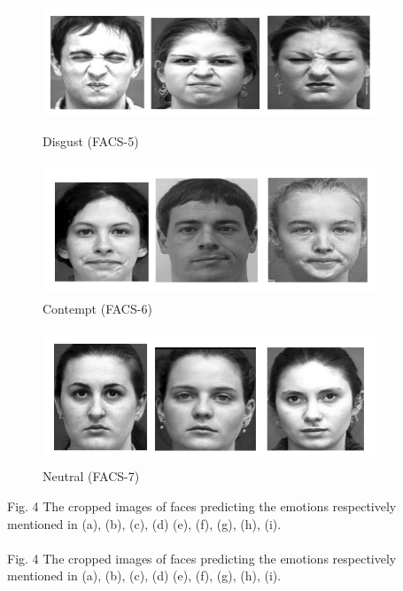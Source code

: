 \documentclass[a4paper,12pt,oneside]{article}
\begin{document}
\begin{figure}[H]
\centering
\includegraphics[height=4cm,width=10cm]{disgust.jpg}
\caption{Disgust (FACS-5)}
\end{figure}

\begin{figure}[H]
\centering
\includegraphics[height=4cm,width=10cm]{contempt.jpg}
\caption{Contempt (FACS-6)}
\end{figure}

\begin{figure}[H]
\centering
\includegraphics[height=4cm,width=10cm]{neutral.jpg}
\caption{Neutral (FACS-7)}
\end{figure}

\begin{center}
Fig. 4 The cropped images of faces predicting the
emotions respectively mentioned in (a), (b), (c), (d) (e),
(f), (g), (h), (i).
\end{center}

\paragraph{}
Fig. 4 The cropped images of faces predicting the
emotions respectively mentioned in (a), (b), (c), (d) (e),
(f), (g), (h), (i).
\end{document}
